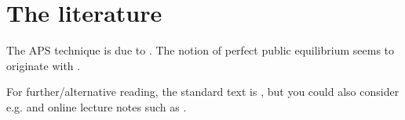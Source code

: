 \section{The literature}
\label{aps:lit}

The APS technique is due to \textcite{AbreuPearceStacchetti1986,AbreuPearceStacchetti1990}. The notion of perfect public equilibrium seems to originate with \textcite{FudenbergLevine1989,FudenbergLevineMaskin1994}.

For further/alternative reading, the standard text is \textcite[chapters~7--8]{MailathSamuelson2006}, but you could also consider e.g. \textcite[section~5.5]{FudenbergTirole1991} and online lecture notes such as \textcite{Levin2006aps}.
